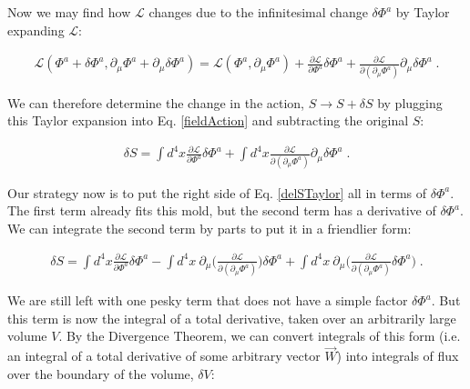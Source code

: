 \documentclass[10pt]{article}
\begin{document}
               		Now we may find how $\mathcal{L}$ changes due to the infinitesimal change $\delta \Phi^a$ by Taylor expanding $\mathcal{L}$:
               		
               		\begin{align}\label{taylorL}
               		    \mathcal{L}(\Phi^a + \delta \Phi^a, \partial_\mu \Phi^a + \partial_\mu \delta \Phi^a) = \mathcal{L}(\Phi^a,\partial_\mu \Phi^a) + \frac{\partial \mathcal{L}}{\partial \Phi^a} \delta \Phi^a + \frac{\partial \mathcal{L}}{\partial (\partial_\mu \Phi^a)} \partial_\mu \delta \Phi^a \; .
               		\end{align}
               		
               		We can therefore determine the change in the action, $S \rightarrow{} S + \delta S$ by plugging this Taylor expansion into Eq. \ref{fieldAction} and subtracting the original $S$:
               		
               		\begin{align}\label{delSTaylor}
               		\delta S = \int d^4x \frac{\partial \mathcal{L}}{\partial \Phi^a} \delta \Phi^a + \int d^4x \frac{\partial \mathcal{L}}{\partial (\partial_\mu \Phi^a)} \partial_\mu \delta \Phi^a \; .
               		\end{align}
               		
               		Our strategy now is to put the right side of Eq. \ref{delSTaylor} all in terms of $\delta \Phi^a$. The first term already fits this mold, but the second term has a derivative of $\delta \Phi^a$. We can integrate the second term by parts to put it in a friendlier form:
               		
               		\begin{align}\label{intbyparts}
               		    \delta S = \int d^4x \frac{\partial \mathcal{L}}{\partial \Phi^a} \delta \Phi^a - \int d^4x \:  \partial_\mu \bigg( \frac{\partial \mathcal{L}}{\partial (\partial_\mu \Phi^a)} \bigg) \delta \Phi^a + \int d^4x \:  \partial_\mu \bigg(\frac{\partial \mathcal{L}}{\partial (\partial_\mu \Phi^a)} \delta \Phi^a \bigg) \; .
               		\end{align}
               		
               		We are still left with one pesky term that does not have a simple factor $\delta \Phi^a$. But this term is now the integral of a total derivative, taken over an arbitrarily large volume $V$. By the Divergence Theorem, we can convert integrals of this form (i.e. an integral of a total derivative of some arbitrary vector $\vec{W}$) into integrals of flux over the boundary of the volume, $\delta V$:
               		
\end{document}
